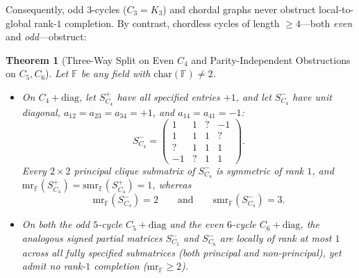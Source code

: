 \documentclass[11pt]{article}
\newtheorem{theorem}{Theorem}[section]
\theoremstyle{definition}
\newcommand{\F}{\mathbb{F}}
\newcommand{\mr}{\mathrm{mr}}
\newcommand{\smr}{\mathrm{smr}}
\begin{document}
Consequently, odd $3$-cycles ($C_3 = K_3$) and chordal graphs never obstruct local-to-global rank-$1$ completion. By contrast, chordless cycles of length $\ge 4$---both \emph{even} and \emph{odd}---obstruct:

\begin{theorem}[Three-Way Split on Even $C_4$ and Parity-Independent Obstructions on $C_5, C_6$]\label{thm:sym-unit}
Let $\F$ be any field with $\mathrm{char}(\F)\neq 2$.
\begin{itemize}
\item[(a)] On $C_4 + \mathrm{diag}$, let $S_{C_4}^+$ have all specified entries $+1$, and let $S_{C_4}^-$ have unit diagonal, $a_{12}=a_{23}=a_{34}=+1$, and $a_{14}=a_{41}=-1$:
\[
S_{C_4}^- = \begin{pmatrix}
1 & 1 & ? & -1 \\
1 & 1 & 1 & ? \\
? & 1 & 1 & 1 \\
-1 & ? & 1 & 1
\end{pmatrix}.
\]
Every $2\times 2$ principal clique submatrix of $S_{C_4}^-$ is symmetric of rank $1$, and $\mr_{\F}(S_{C_4}^+) = \smr_{\F}(S_{C_4}^+) = 1$, whereas
\[
\mr_{\F}(S_{C_4}^-) = 2 \qquad \text{and} \qquad \smr_{\F}(S_{C_4}^-) = 3.
\]
\item[(b)] On both the \emph{odd} $5$-cycle $C_5 + \mathrm{diag}$ and the \emph{even} $6$-cycle $C_6 + \mathrm{diag}$, the analogous signed partial matrices $S_{C_5}^-$ and $S_{C_6}^-$ are locally of rank at most $1$ across \emph{all} fully specified submatrices (both principal and non-principal), yet admit no rank-$1$ completion ($\mr_{\F} \ge 2$).
\end{itemize}
\end{theorem}
\end{document}
